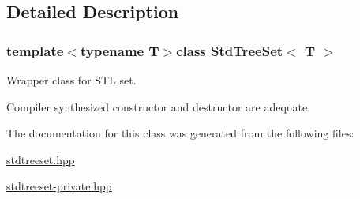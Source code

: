\subsection{Detailed Description}
\subsubsection*{template$<$typename T$>$class Std\-Tree\-Set$<$ T $>$}

Wrapper class for S\-T\-L set. 

Compiler synthesized constructor and destructor are adequate. 

The documentation for this class was generated from the following files\-:\begin{DoxyCompactItemize}
\item 
\hyperlink{stdtreeset_8hpp}{stdtreeset.\-hpp}\item 
\hyperlink{stdtreeset-private_8hpp}{stdtreeset-\/private.\-hpp}\end{DoxyCompactItemize}
